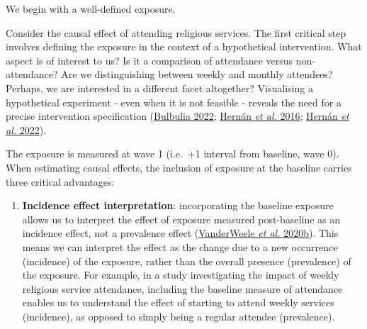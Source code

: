 \documentclass[
  singlecolumn]{article}
\providecommand{\tightlist}{%
  \setlength{\itemsep}{0pt}\setlength{\parskip}{0pt}}\usepackage{longtable,booktabs,array}
\begin{document}
We begin with a well-defined exposure.

Consider the causal effect of attending religious services. The first
critical step involves defining the exposure in the context of a
hypothetical intervention. What aspect is of interest to us? Is it a
comparison of attendance versus non-attendance? Are we distinguishing
between weekly and monthly attendees? Perhaps, we are interested in a
different facet altogether? Visualising a hypothetical experiment - even
when it is not feasible - reveals the need for a precise intervention
specification (\hyperref[ref-bulbulia2022]{Bulbulia 2022};
\hyperref[ref-hernuxe1n2016a]{Hernán \emph{et al.} 2016};
\hyperref[ref-hernuxe1n2022]{Hernán \emph{et al.} 2022}).

The exposure is measured at wave 1 (i.e.~+1 interval from baseline, wave
0). When estimating causal effects, the inclusion of exposure at the
baseline carries three critical advantages:

\begin{enumerate}
\def\labelenumi{\alph{enumi}.}
\tightlist
\item
  \textbf{Incidence effect interpretation}: incorporating the baseline
  exposure allows us to interpret the effect of exposure measured
  post-baseline as an incidence effect, not a prevalence effect
  (\hyperref[ref-vanderweele2020]{VanderWeele \emph{et al.} 2020b}).
  This means we can interpret the effect as the change due to a new
  occurrence (incidence) of the exposure, rather than the overall
  presence (prevalence) of the exposure. For example, in a study
  investigating the impact of weekly religious service attendance,
  including the baseline measure of attendance enables us to understand
  the effect of starting to attend weekly services (incidence), as
  opposed to simply being a regular attendee (prevalence).
\end{enumerate}
\end{document}
